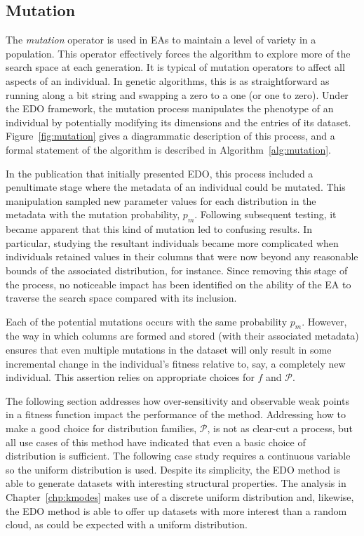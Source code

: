 
\subsection{Mutation}\label{subsection:mutation}

The \emph{mutation} operator is used in EAs to maintain a level of variety in a
population. This operator effectively forces the algorithm to explore more of
the search space at each generation. It is typical of mutation operators to
affect all aspects of an individual. In genetic algorithms, this is as
straightforward as running along a bit string and swapping a zero to a one (or
one to zero). Under the EDO framework, the mutation process manipulates the
phenotype of an individual by potentially modifying its dimensions and the
entries of its dataset. Figure~\ref{fig:mutation} gives a diagrammatic
description of this process, and a formal statement of the algorithm is
described in Algorithm~\ref{alg:mutation}.

In the publication that initially presented EDO, this process included a
penultimate stage where the metadata of an individual could be mutated. This
manipulation sampled new parameter values for each distribution in the metadata
with the mutation probability, \(p_m\). Following subsequent testing, it became
apparent that this kind of mutation led to confusing results. In particular,
studying the resultant individuals became more complicated when individuals
retained values in their columns that were now beyond any reasonable bounds of
the associated distribution, for instance. Since removing this stage of the
process, no noticeable impact has been identified on the ability of the EA to
traverse the search space compared with its inclusion.


Each of the potential mutations occurs with the same probability \(p_m\).
However, the way in which columns are formed and stored (with their associated
metadata) ensures that even multiple mutations in the dataset will only result
in some incremental change in the individual's fitness relative to, say, a
completely new individual. This assertion relies on appropriate choices for
\(f\) and \(\mathcal{P}\).

The following section addresses how over-sensitivity and observable weak points
in a fitness function impact the performance of the method. Addressing how to
make a good choice for distribution families, \(\mathcal P\), is not as
clear-cut a process, but all use cases of this method have indicated that even a
basic choice of distribution is sufficient. The following case study requires a
continuous variable so the uniform distribution is used. Despite its simplicity,
the EDO method is able to generate datasets with interesting structural
properties. The analysis in Chapter~\ref{chp:kmodes} makes use of a discrete
uniform distribution and, likewise, the EDO method is able to offer up datasets
with more interest than a random cloud, as could be expected with a uniform
distribution.


